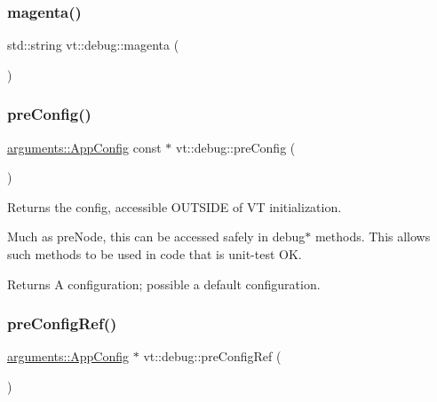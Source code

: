 \subsubsection{\texorpdfstring{magenta()}{magenta()}}
{\footnotesize\ttfamily std\+::string vt\+::debug\+::magenta (\begin{DoxyParamCaption}{ }\end{DoxyParamCaption})\hspace{0.3cm}{\ttfamily [inline]}}

\mbox{\label{namespacevt_1_1debug_a852027d87cfb65bb21dd8ce1e8c23c61}} 
\subsubsection{\texorpdfstring{pre\+Config()}{preConfig()}}
{\footnotesize\ttfamily \hyperlink{structvt_1_1arguments_1_1_app_config}{arguments\+::\+App\+Config} const  $\ast$ vt\+::debug\+::pre\+Config (\begin{DoxyParamCaption}{ }\end{DoxyParamCaption})}



Returns the config, accessible O\+U\+T\+S\+I\+DE of VT initialization. 

Much as pre\+Node, this can be accessed safely in debug$\ast$ methods. This allows such methods to be used in code that is unit-\/test OK.

\begin{DoxyReturn}{Returns}
A configuration; possible a default configuration. 
\end{DoxyReturn}
\mbox{\label{namespacevt_1_1debug_af579167c636c87a9832bba4e05867031}} 
\subsubsection{\texorpdfstring{pre\+Config\+Ref()}{preConfigRef()}}
{\footnotesize\ttfamily \hyperlink{structvt_1_1arguments_1_1_app_config}{arguments\+::\+App\+Config} $\ast$ vt\+::debug\+::pre\+Config\+Ref (\begin{DoxyParamCaption}{ }\end{DoxyParamCaption})}



